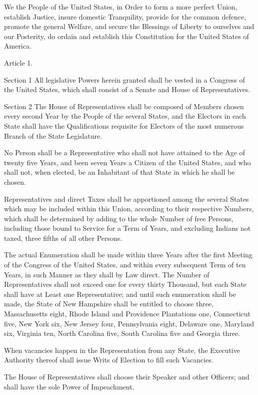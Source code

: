 \documentclass{article}
\begin{document}
We the People of the United States, in Order to form a more perfect Union,
establish Justice, insure domestic Tranquility, provide for the common
defence, promote the general Welfare, and secure the Blessings of Liberty to
ourselves and our Posterity, do ordain and establish this Constitution for the
United States of America.

Article 1.

Section 1
All legislative Powers herein granted shall be vested in a Congress of the
United States, which shall consist of a Senate and House of Representatives.

Section 2
The House of Representatives shall be composed of Members chosen every second
Year by the People of the several States, and the Electors in each State shall
have the Qualifications requisite for Electors of the most numerous Branch of
the State Legislature.

No Person shall be a Representative who shall not have attained to the Age of
twenty five Years, and been seven Years a Citizen of the United States, and who
shall not, when elected, be an Inhabitant of that State in which he shall be
chosen.

Representatives and direct Taxes shall be apportioned among the several States
which may be included within this Union, according to their respective Numbers,
which shall be determined by adding to the whole Number of free Persons,
including those bound to Service for a Term of Years, and excluding Indians not
taxed, three fifths of all other Persons.

The actual Enumeration shall be made within three Years after the first Meeting
of the Congress of the United States, and within every subsequent Term of ten
Years, in such Manner as they shall by Law direct. The Number of
Representatives shall not exceed one for every thirty Thousand, but each State
shall have at Least one Representative; and until such enumeration shall be
made, the State of New Hampshire shall be entitled to choose three,
Massachusetts eight, Rhode Island and Providence Plantations one, Connecticut
five, New York six, New Jersey four, Pennsylvania eight, Delaware one, Maryland
six, Virginia ten, North Carolina five, South Carolina five and Georgia three.

When vacancies happen in the Representation from any State, the Executive
Authority thereof shall issue Writs of Election to fill such Vacancies.

The House of Representatives shall choose their Speaker and other Officers; and
shall have the sole Power of Impeachment.
\end{document}

